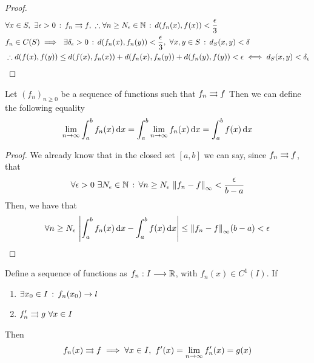 \documentclass[../complete.tex]{subfiles}
\begin{document}
\begin{proof}
	\begin{equation}
		\begin{aligned}
			&\forall x\in S,\ \exists\epsilon>0\st f_n\tto f,\ \therefore\forall n\ge N_\epsilon\in\N\st d(f_n(x),f(x))<\frac{\epsilon}{3}\\
			&f_n\in C(S)\implies{}\ \exists\delta_\epsilon>0\st d(f_n(x),f_n(y))<\frac{\epsilon}{3},\ \forall x,y\in S\st d_S(x,y)<\delta\\
			&\therefore d(f(x),f(y))\le d(f(x),f_n(x))+d(f_n(x),f_n(y))+d(f_n(y),f(y))<\epsilon\iff d_S(x,y)<\delta_\epsilon
		\end{aligned}
		\label{eq:proofustopwc}
	\end{equation}
\end{proof}
\begin{thm}
	Let $(f_n)_{n\ge0}$ be a sequence of functions such that $f_n\rightrightarrows f$
	Then we can define the following equality
	\begin{equation}
		\lim_{n\to\infty}\int_a^bf_n(x)\operatorname{d\!} x=\int_a^b\lim_{n\to\infty}f_n(x)\operatorname{d\!} x=\int_a^bf(x)\operatorname{d\!} x
		\label{eq:seqint}
	\end{equation}
\end{thm}
\begin{proof}
	We already know that in the closed set $[a,b]$ we can say, since $f_n\rightrightarrows f$, that
	\begin{equation}
		\forall\epsilon>0\ \exists N_\epsilon\in\N\st\forall n\ge N_\epsilon\ \norm{f_n-f}_{\infty}<\frac{\epsilon}{b-a}
		\label{eq:seqint1}
	\end{equation}
	Then, we have that
	\begin{equation}
		\forall n\ge N_\epsilon\ \abs{\int_{a}^{b}f_n(x)\diff x-\int_{a}^{b}f(x)\diff x}\le\norm{f_n-f}_\infty(b-a)<\epsilon
		\label{eq:seqint2}
	\end{equation}
\end{proof}
\begin{thm}
	Define a sequence of functions as $f_n:I\overset{}{\longrightarrow}\mathbb{R}$, with $f_n(x)\in C^1(I)$. If
	\begin{enumerate}
	\item $\exists x_0\in I\, :\,  f_n(x_0)\to l$
	\item $f_n'\rightrightarrows g\ \forall x\in I$
	\end{enumerate}
	Then
	\begin{equation}
		f_n(x)\rightrightarrows f\implies{}\forall x\in I,\ f'(x)=\lim_{n\to\infty}f_n'(x)=g(x)
		\label{eq:seqder1}
	\end{equation}
\end{thm}
\end{document}
